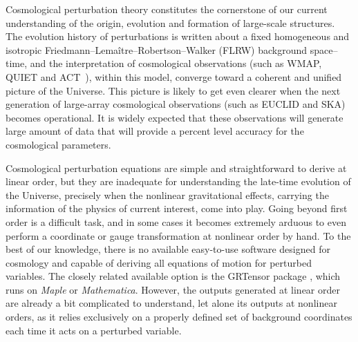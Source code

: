 \documentclass[notitlepage,onecolumn,floatfix,preprintnumbers,aps,prd,showpacs,nofootinbib,amsmath,amssymb,amsfonts]{revtex4-1}
\newcommand{\<}{\langle}
\renewcommand{\>}{\rangle}
\begin{document}
\vspace{-1mm}

Cosmological perturbation theory constitutes the cornerstone of our current understanding of the origin, 
evolution and formation of large-scale structures. The evolution history of perturbations is written about 
a fixed homogeneous and isotropic Friedmann--Lema\^itre--Robertson--Walker (FLRW) background space--time, 
and the interpretation of cosmological observations (such as WMAP, QUIET and ACT~\cite{Hinshaw:2012fq,Sievers:2013wk,Araujo:2012yh}), 
within this model, converge toward a coherent and unified picture of the Universe. This picture is likely 
to get even clearer when the next generation of large-array cosmological observations (such as EUCLID and SKA) 
becomes operational. It is widely expected that these observations will generate large amount of data that 
will provide a percent level accuracy for the cosmological parameters. 

Cosmological perturbation equations are simple and straightforward to derive at linear order, but they 
are inadequate for understanding the late-time evolution of the Universe, precisely when the 
nonlinear gravitational effects, carrying the information of the physics of current interest, come into play. 
%
Going beyond first order is a difficult task, and in some cases it becomes extremely arduous to even perform 
a coordinate or gauge transformation at nonlinear order by hand. To the best of our knowledge, there is 
no available easy-to-use software designed for cosmology and capable of deriving all equations of motion 
for perturbed variables. The closely related available option is the GRTensor package \cite{GRTensor}, 
which runs on {\it Maple} or {\it Mathematica}. However, the outputs generated at linear order are 
already a bit complicated to understand, let alone its outputs at nonlinear orders, as it relies exclusively 
on a properly defined set of background coordinates each time it acts on a perturbed variable. 
\end{document}
